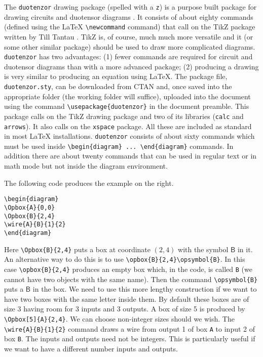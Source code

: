 \documentclass[10pt]{article}
\begin{document}
\newpage


The \verb+duotenzor+ drawing package (spelled with a \verb+z+) is a purpose built package for drawing circuits and duotensor diagrams \cite{Hardyduotensors}.  It consists of about eighty commands (defined using the LaTeX \verb+\newcommand+ command) that call on the TikZ package written by Till Tantau \cite{TikZ}. TikZ is, of course, much much more versatile and it (or some other similar package) should be used to draw more complicated diagrams.  \verb+duotenzor+ has two advantages:  (1) fewer commands are required for circuit and duotensor diagrams than with a more advanced package; (2) producing a drawing is very similar to producing an equation using LaTeX.  The package file, \verb+duotenzor.sty+, can be downloaded from CTAN and, once saved into the appropriate folder (the working folder will suffice), uploaded into the document using the command \verb+\usepackage{duotenzor}+ in the document preamble.  This package calls on the TikZ drawing package \cite{TikZ} and two of its libraries (\verb+calc+ and \verb+arrows+).  It also calls on the \verb+xspace+ package.  All these are included as standard in most LaTeX installations. \verb+duotenzor+ consists of about sixty commands which must be used inside
\verb+\begin{diagram} ... \end{diagram}+ commands.  In addition there are about twenty commands that can be used in regular text or in math mode but not inside the diagram environment.

The following code produces the example on the right.

\begin{verbatim}
\begin{diagram}
\Opbox{A}{0,0}
\Opbox{B}{2,4}
\wire{A}{B}{1}{2}
\end{diagram}
\end{verbatim}

\vspace{-13pt}
\noindent
Here \verb+\Opbox{B}{2,4}+ puts a box at coordinate $(2,4)$ with the symbol $\mathsf B$ in it.  An alternative way to do this is to use
\verb+\opbox{B}{2,4}\opsymbol{B}+.  In this case \verb+\opbox{B}{2,4}+ produces an empty box which, in the code, is called \verb+B+ (we cannot have two objects with the same name).  Then the command \verb+\opsymbol{B}+ puts a $\mathsf B$ in the box.  We need to use this more lengthy construction if we want to have two boxes with the same letter inside them.  By default these boxes are of size 3 having room for 3 inputs and 3 outputs.  A box of size 5 is produced by \verb+\Opbox[5]{A}{2,4}+.  We can choose non-integer sizes should we wish.  The \verb+\wire{A}{B}{1}{2}+ command draws a wire from output 1 of box \verb+A+ to input 2 of box \verb+B+.  The inputs and outputs need not be integers.  This is particularly useful if we want to have a different number inputs and outputs.
\end{document}
